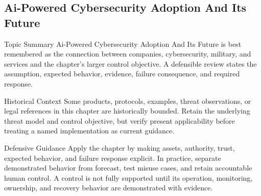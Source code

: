 \documentclass[11pt,letterpaper]{article}
\begin{document}
\subsection*{Ai-Powered Cybersecurity Adoption And Its Future}
\begin{CornellNotesTable}
\end{CornellNotesTable}
\begin{CornellSummaryBox}{Topic Summary}
Ai-Powered Cybersecurity Adoption And Its Future is best remembered as the connection between companies, cybersecurity, military, and services and the chapter's larger control objective. A defensible review states the assumption, expected behavior, evidence, failure consequence, and required response.
\end{CornellSummaryBox}
\begin{CornellWarningBox}{Historical Context}
Some products, protocols, examples, threat observations, or legal references in this chapter are historically bounded. Retain the underlying threat model and control objective, but verify present applicability before treating a named implementation as current guidance.
\end{CornellWarningBox}
\begin{CornellOverviewBox}{Defensive Guidance}
Apply the chapter by making assets, authority, trust, expected behavior, and failure response explicit. In practice, separate demonstrated behavior from forecast, test misuse cases, and retain accountable human control. A control is not fully supported until its operation, monitoring, ownership, and recovery behavior are demonstrated with evidence.
\end{CornellOverviewBox}
\end{document}
